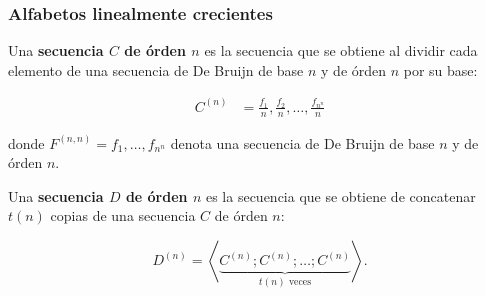 \documentclass[t, 10pt, mathserif]{beamer}
\begin{document}

\begin{frame}
  \frametitle{Alfabetos linealmente crecientes}

  \vspace{-0.4cm}
  \begin{definition}
    Una \textbf{secuencia $C$ de órden $n$} es la secuencia que se obtiene al dividir cada elemento de una secuencia de De Bruijn de base $n$ y de órden $n$ por su base:
    \pause

    \vspace{-0.2cm}
    \begin{equation*}
      \begin{aligned}
        C^{(n)} & = \frac{f_1}{n}, \frac{f_2}{n}, \dots, \frac{f_{n^n}}{n}
      \end{aligned}
    \end{equation*}

    \vspace{-0.2cm}
    donde $F^{(n, n)} = f_1, \dots, f_{n^n}$ denota una secuencia de De Bruijn de base $n$ y de órden $n$.
    \pause

    Una \textbf{secuencia $D$ de órden $n$} es la secuencia que se obtiene de concatenar $t(n)$ copias de una secuencia $C$ de órden $n$:
    \pause

    \vspace{-0.2cm}
    \begin{equation*}
      D^{(n)} = \left< \underbrace{C^{(n)} ; C^{(n)} ; \dots ; C^{(n)}}_{t(n) \text{ veces}} \right> \text{.}
    \end{equation*}
  \end{definition}
\end{frame}

\end{document}
